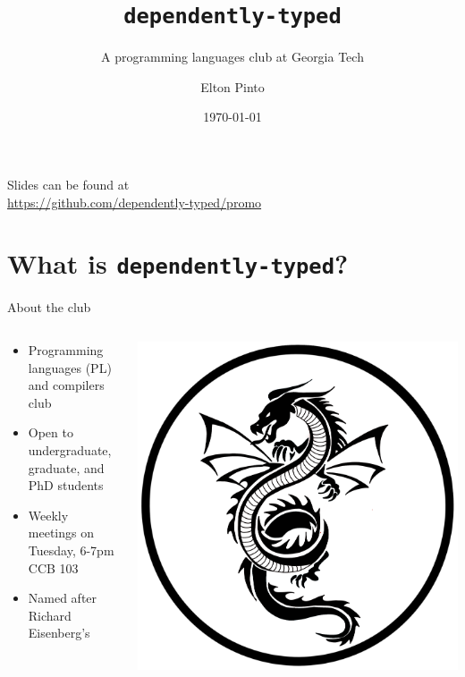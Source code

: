 \documentclass{beamer}
\title{\texttt{dependently-typed}}
\subtitle{A programming languages club at Georgia Tech}
\author{Elton Pinto}
\date{\today}
\begin{document}
\begin{frame}
  \titlepage
\end{frame}

\begin{frame}
  \begin{center}
    Slides can be found at \\
    \small\url{https://github.com/dependently-typed/promo}
  \end{center}
\end{frame}

\section{What is \texttt{dependently-typed}?}

\begin{frame}{About the club}
  \begin{columns}
    \begin{column}{0.8\textwidth}
      \begin{itemize}
      \item Programming languages (PL) and compilers club
      \item Open to undergraduate, graduate, and PhD students
      \item Weekly meetings on Tuesday, 6-7pm CCB 103
      \item Named after Richard Eisenberg's  \cite{eisenberg2016dependent}
      \end{itemize}
    \end{column}

    \begin{column}{0.15\textwidth}
      \centering
      \includegraphics[width=\textwidth]{assets/dragon.png}
    \end{column}
  \end{columns}
\end{frame}
\end{document}
